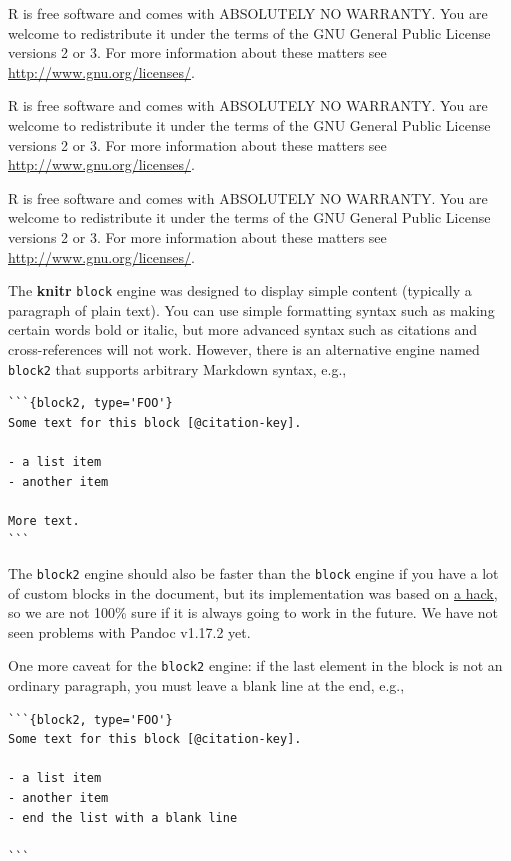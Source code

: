 \documentclass[doctor,openright,twoside]{sjtuthesis}
\newcommand{\passthrough}[1]{#1}
\theoremstyle{plain}
\theoremstyle{definition}
\theoremstyle{remark}
\theoremstyle{ocrenumbox}
\theoremstyle{plain}
\let\BeginKnitrBlock\begin \let\EndKnitrBlock\end
\begin{document}
\BeginKnitrBlock{rmdimportant}
R is free software and comes with ABSOLUTELY NO WARRANTY.
You are welcome to redistribute it under the terms of the
GNU General Public License versions 2 or 3.
For more information about these matters see
\url{http://www.gnu.org/licenses/}.
\EndKnitrBlock{rmdimportant}

\BeginKnitrBlock{rmdtip}
R is free software and comes with ABSOLUTELY NO WARRANTY.
You are welcome to redistribute it under the terms of the
GNU General Public License versions 2 or 3.
For more information about these matters see
\url{http://www.gnu.org/licenses/}.
\EndKnitrBlock{rmdtip}

\BeginKnitrBlock{rmdwarning}
R is free software and comes with ABSOLUTELY NO WARRANTY.
You are welcome to redistribute it under the terms of the
GNU General Public License versions 2 or 3.
For more information about these matters see
\url{http://www.gnu.org/licenses/}.
\EndKnitrBlock{rmdwarning}

The \textbf{knitr} \passthrough{\lstinline!block!} engine was designed to display simple content (typically a paragraph of plain text). You can use simple formatting syntax such as making certain words bold or italic, but more advanced syntax such as citations and cross-references will not work. However, there is an alternative engine named \passthrough{\lstinline!block2!} that supports arbitrary Markdown syntax, e.g.,

\begin{lstlisting}
```{block2, type='FOO'}
Some text for this block [@citation-key].

- a list item
- another item

More text.
```
\end{lstlisting}

The \passthrough{\lstinline!block2!} engine should also be faster than the \passthrough{\lstinline!block!} engine if you have a lot of custom blocks in the document, but its implementation was based on \href{https://github.com/jgm/pandoc/issues/2453}{a hack,} so we are not 100\% sure if it is always going to work in the future. We have not seen problems with Pandoc v1.17.2 yet.

One more caveat for the \passthrough{\lstinline!block2!} engine: if the last element in the block is not an ordinary paragraph, you must leave a blank line at the end, e.g.,

\begin{lstlisting}
```{block2, type='FOO'}
Some text for this block [@citation-key].

- a list item
- another item
- end the list with a blank line

```
\end{lstlisting}
\end{document}
